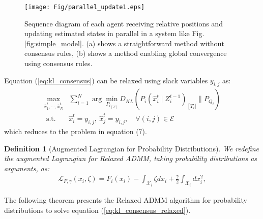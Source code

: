 \documentclass[a4paper,fleqn,10pt,twocolumn]{SICE_ISCS}
\newtheorem{definition}{Definition}
\begin{document}
\begin{figure}[t]
	\begin{center}
		\texttt{[image: Fig/parallel\_update1.eps]}
		\caption{Sequence diagram of each agent receiving relative positions and updating estimated states in parallel in a system like Fig. \ref{fig:simple_model}. (a) shows a straightforward method without consensus rules, (b) shows a method enabling global convergence using consensus rules.}
		\label{fig:parallel_update}
	\end{center}
	\vspace{-2mm}
\end{figure}

Equation (\ref{eq:kl_consensus}) can be relaxed using slack variables $y_{i,j}$ as:
\begin{equation}
\begin{aligned}
\max _{\hat x_{1}^{t}, \cdots, \hat x_{N}^{t}} & \sum_{i=1}^{N} \arg \min _{{P_{i}}_{[T]}} D_{K L}\left(P_{i}\left(\hat x_{i}^{t} \mid Z_{i}^{t-1}\right)_{\left[T_{i}]\right.} \| P_{Q_{i}} \right) \\
\text { s.t. } & \hat x_{i}^{t}=y_{i,j}, \:\hat x_{j}^{t}=y_{i,j}, \quad\forall(i, j) \in \mathcal{E}
\label{eq:kl_consensus_relaxed}
\end{aligned}
\end{equation}
which reduces to the problem in equation (7).

\begin{definition}[Augmented Lagrangian for Probability Distributions]
We redefine the augmented Lagrangian for Relaxed ADMM, taking probability distributions as arguments, as:
\begin{equation}
\begin{aligned}
 {\mathcal{ L}}_{F,\gamma}(x_i, \zeta) 
 = F_i(x_i) - \int_{{\mathcal{X}}_i}
\zeta dx_i + \frac{\gamma}{2}\int_{{\mathcal{X}}_i} dx_i^2,
\label{eq:relaxed_lagrangian}
\end{aligned}
\end{equation}
\end{definition}

The following theorem presents the Relaxed ADMM algorithm for probability distributions to solve equation (\ref{eq:kl_consensus_relaxed}).
\end{document}
